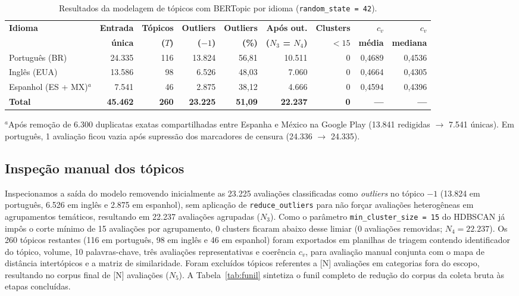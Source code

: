 \begin{table}[htbp]
\centering
\caption{Resultados da modelagem de tópicos com BERTopic por idioma (\texttt{random\_state = 42}).}
\label{tab:bertopic}
\footnotesize
\setlength{\tabcolsep}{4pt}
\begin{tabular}{lrrrrrrrr}
\toprule
\textbf{Idioma} & \textbf{Entrada} & \textbf{Tópicos} & \textbf{Outliers} & \textbf{Outliers} & \textbf{Após out.} & \textbf{Clusters} & \textbf{$c_v$} & \textbf{$c_v$} \\
 & \textbf{única} & \textbf{($T$)} & \textbf{($-1$)} & \textbf{(\%)} & \textbf{($N_3$ = $N_4$)} & \textbf{$< 15$} & \textbf{média} & \textbf{mediana} \\
\midrule
Português (BR)       & 24.335 & 116 & 13.824 & 56{,}81 & 10.511 & 0 & 0{,}4689 & 0{,}4536 \\
Inglês (EUA)         & 13.586 &  98 &  6.526 & 48{,}03 &  7.060 & 0 & 0{,}4664 & 0{,}4305 \\
Espanhol (ES + MX)$^a$ & 7.541 &  46 &  2.875 & 38{,}12 &  4.666 & 0 & 0{,}4594 & 0{,}4396 \\
\midrule
\textbf{Total}       & \textbf{45.462} & \textbf{260} & \textbf{23.225} & \textbf{51{,}09} & \textbf{22.237} & \textbf{0} & \textbf{---} & \textbf{---} \\
\bottomrule
\end{tabular}

\smallskip
\raggedright\scriptsize
$^a$Após remoção de 6.300 duplicatas exatas compartilhadas entre Espanha e México na Google Play (13.841 redigidas $\to$ 7.541 únicas). Em português, 1 avaliação ficou vazia após supressão dos marcadores de censura (24.336 $\to$ 24.335).
\end{table}

\subsection{Inspeção manual dos tópicos}

Inspecionamos a saída do modelo removendo inicialmente as 23.225 avaliações classificadas como \textit{outliers} no tópico $-1$ (13.824 em português, 6.526 em inglês e 2.875 em espanhol), sem aplicação de \texttt{reduce\_outliers} para não forçar avaliações heterogêneas em agrupamentos temáticos, resultando em 22.237 avaliações agrupadas ($N_3$). Como o parâmetro \texttt{min\_cluster\_size = 15} do HDBSCAN já impôs o corte mínimo de 15 avaliações por agrupamento, 0 clusters ficaram abaixo desse limiar (0 avaliações removidas; $N_4 = 22.237$). Os 260 tópicos restantes (116 em português, 98 em inglês e 46 em espanhol) foram exportados em planilhas de triagem contendo identificador do tópico, volume, 10 palavras-chave, três avaliações representativas e coerência $c_v$, para avaliação manual conjunta com o mapa de distância intertópicos e a matriz de similaridade.
Foram excluídos tópicos referentes a [N] avaliações em categorias fora do escopo, resultando no corpus final de [N] avaliações ($N_5$).
A Tabela~\ref{tab:funil} sintetiza o funil completo de redução do corpus da coleta bruta às etapas concluídas.

